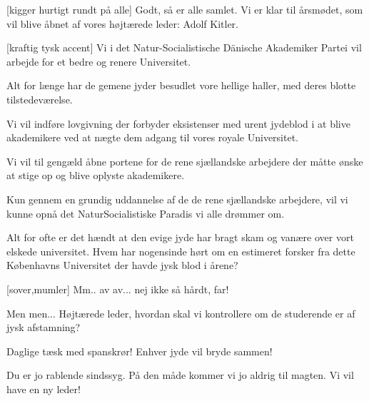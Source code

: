 \documentclass[a4paper,11pt]{article}
\begin{document}
  
\begin{sketch}


[kigger hurtigt rundt på alle] Godt, så er alle samlet. Vi er klar til årsmødet, som vil blive åbnet af vores højtærede leder: Adolf Kitler.


[kraftig tysk accent] Vi i det Natur-Socialistische Dänische Akademiker Partei vil arbejde for et bedre og renere Universitet.

 Alt for længe har de gemene jyder besudlet vore hellige haller, med deres blotte tilstedeværelse.

 Vi vil indføre lovgivning der forbyder eksistenser med urent jydeblod i at blive akademikere ved at nægte dem adgang til vores royale Universitet.

 Vi vil til gengæld åbne portene for de rene sjællandske arbejdere der måtte ønske at stige op og blive oplyste akademikere.

 Kun gennem en grundig uddannelse af de de rene sjællandske arbejdere, vil vi kunne opnå det NaturSocialistiske Paradis vi alle drømmer om.
 
 Alt for ofte er det hændt at den evige jyde har bragt skam og vanære over vort elskede universitet. Hvem har nogensinde hørt om en estimeret forsker fra dette Københavns Universitet der havde jysk blod i årene?

[sover,mumler]  Mm.. av av... nej ikke så hårdt, far!  

 Men men... Højtærede leder, hvordan skal vi kontrollere om de studerende er af jysk afstamning?

 Daglige tæsk med spanskrør! Enhver jyde vil bryde sammen!

 Du er jo rablende sindssyg. På den måde kommer vi jo aldrig til magten. Vi vil have en ny leder!





\end{sketch}
\end{document}
